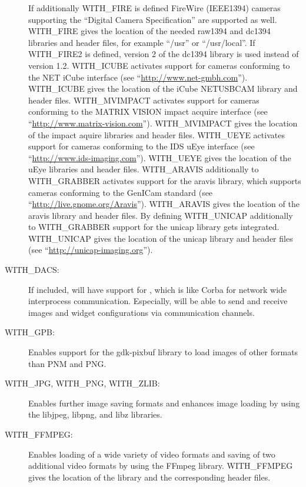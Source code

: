 \begin{description}
  If additionally WITH\_FIRE is defined FireWire (IEEE1394) cameras
  supporting the ``Digital Camera Specification'' are supported as
  well. WITH\_FIRE gives the location of the needed raw1394 and
  dc1394 libraries and header files, for example ``/usr'' or
  ``/usr/local''. If WITH\_FIRE2 is defined, version 2 of the dc1394
  library is used instead of version 1.2. WITH\_ICUBE activates
  support for cameras conforming to the NET iCube
  interface (see ``\url{http://www.net-gmbh.com}''). WITH\_ICUBE
  gives the location of the iCube NETUSBCAM library and header
  files. WITH\_MVIMPACT activates support for cameras conforming to
  the MATRIX VISION impact acquire interface (see
  ``\url{http://www.matrix-vision.com}''). WITH\_MVIMPACT gives the
  location of the impact aquire libraries and header
  files. WITH\_UEYE activates support for cameras conforming to the
  IDS uEye interface (see
  ``\url{http://www.ids-imaging.com}''). WITH\_UEYE gives the
  location of the uEye libraries and header files. WITH\_ARAVIS
  additionally to WITH\_GRABBER activates support for the aravis
  library, which supports cameras conforming to the GenICam standard
  (see ``\url{http://live.gnome.org/Aravis}''). WITH\_ARAVIS gives
  the location of the aravis library and header files. By defining
  WITH\_UNICAP additionally to WITH\_GRABBER support for the unicap
  library gets integrated. WITH\_UNICAP gives the location of the
  unicap library and header files (see
  ``\url{http://unicap-imaging.org}'').

\item[WITH\_DACS:]
  If included, \icewing{} will have support for \dacs{}, which is
  like Corba for network wide interprocess
  communication. Especially, \icewing{} will be able to send and
  receive images and widget configurations via \dacs{} communication
  channels.

\item[WITH\_GPB:]
  Enables support for the gdk-pixbuf library to load images of other
  formats than PNM and PNG.

\item[WITH\_JPG, WITH\_PNG, WITH\_ZLIB:]
  Enables further image saving formats and enhances image loading by
  using the libjpeg, libpng, and libz libraries.

\item[WITH\_FFMPEG:]
  Enables loading of a wide variety of video formats and saving of
  two additional video formats by using the FFmpeg
  library. WITH\_FFMPEG gives the location of the library and the
  corresponding header files.
\end{description}

